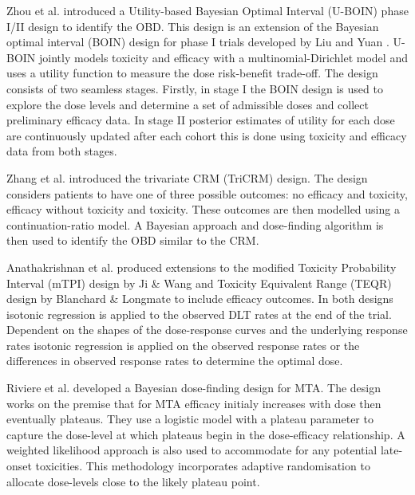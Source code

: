 Zhou et al. \cite{zhouUtilitybasedBayesianOptimal2019} introduced a Utility-based Bayesian Optimal Interval (U-BOIN) phase \RN{1}/\RN{2} design to identify the OBD. This design is an extension of the Bayesian optimal interval (BOIN) design for phase \RN{1} trials developed by Liu and Yuan \cite{liuBAYESIANDATAAUGMENTATION2013}. U-BOIN jointly models toxicity and efficacy with a multinomial-Dirichlet model and uses a utility function to measure the dose risk-benefit trade-off. The design consists of two seamless stages. Firstly, in stage \RN{1} the BOIN design is used to explore the dose levels and determine a set of admissible doses and collect preliminary efficacy data. In stage \RN{2} posterior estimates of utility for each dose are continuously updated after each cohort this is done using toxicity and efficacy data from both stages. 

Zhang et al. \cite{zhangAdaptiveDosefindingDesign2006} introduced the trivariate CRM (TriCRM) design. The design considers patients to have one of three possible outcomes: no efficacy and toxicity, efficacy without toxicity and toxicity. These outcomes are then modelled using a continuation-ratio model. A Bayesian approach and dose-finding algorithm is then used to identify the OBD similar to the CRM.  

Anathakrishnan et al. \cite{ananthakrishnanExtensionsMTPITEQR2018} produced extensions to the modified Toxicity Probability Interval (mTPI) design by Ji \& Wang \cite{jiModifiedToxicityProbability2013} and Toxicity Equivalent Range (TEQR) design by Blanchard \& Longmate \cite{blanchardToxicityEquivalenceRange2011} to include efficacy outcomes. In both designs isotonic regression is applied to the observed DLT rates at the end of the trial. Dependent on the shapes of the dose-response curves and the underlying response rates isotonic regression is applied on the observed response rates or the differences in observed response rates to determine the optimal dose. 

Riviere et al. \cite{rivierePhaseIIDosefinding2018} developed a Bayesian dose-finding design for MTA. The design works on the premise that for MTA efficacy initialy increases with dose then eventually plateaus. They use a logistic model with a plateau parameter to capture the dose-level at which plateaus begin in  the dose-efficacy relationship. A weighted likelihood approach is also used to accommodate for any potential late-onset toxicities. This methodology incorporates adaptive randomisation to allocate dose-levels close to the likely plateau point.


